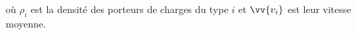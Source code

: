 ﻿\documentclass[a4paper]{article}
\begin{document}
\pagestyle{fancy}
\fancyhf{}
\setlength{\headheight}{15pt}

\begin{center}
	\large{}
\end{center}


 où \(\rho_i\) est la densité des porteurs de charges du type \(i\) et \(\vv{v_i}\) est leur vitesse moyenne.
\end{document}
